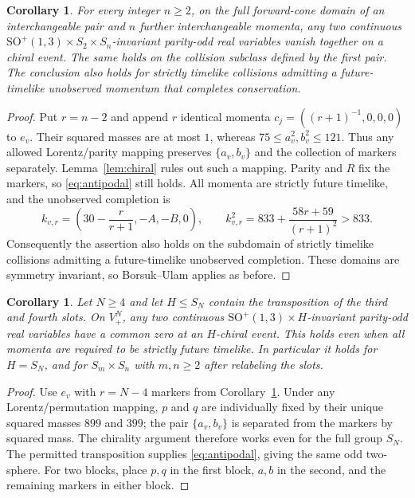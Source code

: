 \documentclass[11pt,a4paper]{article}
\newtheorem{corollary}[theorem]{Corollary}
\newcommand{\SO}{\mathrm{SO}^{+}(1,3)}
\begin{document}
\begin{corollary}\label{cor:many}
For every integer $n\geq2$, on the full forward-cone domain of an
interchangeable pair and $n$ further interchangeable momenta, any
two continuous $\SO\times S_2\times S_n$-invariant parity-odd real
variables vanish together on a chiral event. The same holds on the
collision subclass defined by the first pair.
The conclusion also holds for strictly timelike collisions admitting
a future-timelike unobserved momentum that completes conservation.
\end{corollary}
\begin{proof}
Put $r=n-2$ and append $r$ identical momenta
$c_j=((r+1)^{-1},0,0,0)$ to $e_v$. Their squared masses are at most
$1$, whereas $75\leq a_v^2,b_v^2\leq121$. Thus any allowed
Lorentz/parity mapping preserves $\{a_v,b_v\}$ and the collection of
markers separately. Lemma~\ref{lem:chiral} rules out such a mapping.
Parity and $R$ fix the markers, so \eqref{eq:antipodal} still holds.
All momenta are strictly future timelike, and the unobserved completion is
\[
 k_{v,r}=\left(30-\frac{r}{r+1},-A,-B,0\right),\qquad
 k_{v,r}^2=833+\frac{58r+59}{(r+1)^2}>833.
\]
Consequently the assertion also holds on the subdomain of strictly
timelike collisions admitting a future-timelike unobserved completion.
These domains are symmetry invariant, so Borsuk--Ulam applies as before.
\end{proof}

\newpage
\begin{corollary}\label{cor:permutations}
Let $N\geq4$ and let $H\leq S_N$ contain the transposition of the
third and fourth slots. On $V_+^N$, any two continuous
$\SO\times H$-invariant parity-odd real variables have a common zero
at an $H$-chiral event. This holds even when all momenta are required
to be strictly future timelike. In particular it holds for $H=S_N$,
and for $S_m\times S_n$ with $m,n\geq2$ after relabeling the slots.
\end{corollary}
\begin{proof}
Use $e_v$ with $r=N-4$ markers from Corollary~\ref{cor:many}.
Under any Lorentz/permutation mapping, $p$ and $q$ are individually
fixed by their unique squared masses $899$ and $399$; the pair
$\{a_v,b_v\}$ is separated from the markers by squared mass.
The chirality argument therefore works even for the full group $S_N$.
The permitted transposition supplies \eqref{eq:antipodal}, giving the
same odd two-sphere. For two blocks, place $p,q$ in the first block,
$a,b$ in the second, and the remaining markers in either block.
\end{proof}
\end{document}

